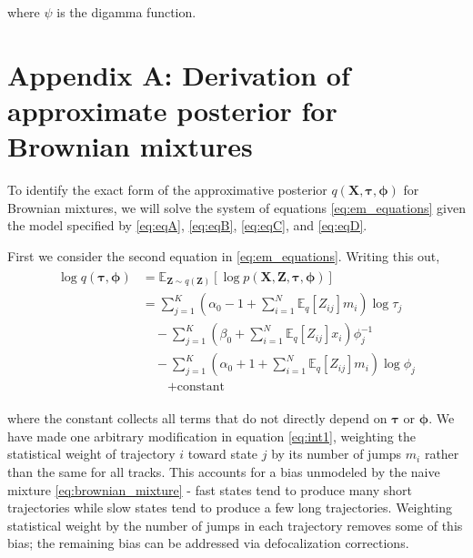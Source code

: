 \documentclass{article}
\let\vec\boldsymbol
\begin{document}
where $\psi$ is the digamma function.

\appendix

\section{Appendix A: Derivation of approximate posterior for Brownian mixtures}\label{appendix:derivation_approx_posterior}

To identify the exact form of the approximative posterior $q(\vec{X}, \boldsymbol{\tau}, \boldsymbol{\phi})$ for Brownian mixtures, we will solve the system of equations \ref{eq:em_equations} given the model specified by \ref{eq:eqA}, \ref{eq:eqB}, \ref{eq:eqC}, and \ref{eq:eqD}. \newline

First we consider the second equation in \ref{eq:em_equations}. Writing this out,
\begin{align}\begin{split}\label{eq:int1}
    \log q \left( \boldsymbol{\tau}, \boldsymbol{\phi} \right) &= \mathbb{E}_{\vec{Z} \sim q(\vec{Z})} \left[ \log p \left( \vec{X}, \vec{Z}, \boldsymbol{\tau}, \boldsymbol{\phi} \right) \right] \\
    &= \sum\limits_{j=1}^{K} \left( \alpha_{0} - 1 + \sum\limits_{i=1}^{N} \mathbb{E}_{q} \left[ Z_{ij} \right] m_{i} \right) \log \tau_{j} \\
    &\quad - \sum\limits_{j=1}^{K} \left( \beta_{0} + \sum\limits_{i=1}^{N} \mathbb{E}_{q} \left[ Z_{ij} \right] x_{i} \right) \phi_{j}^{-1} \\
    &\quad - \sum\limits_{j=1}^{K} \left(
        \alpha_{0} + 1 + \sum\limits_{i=1}^{N} \mathbb{E}_{q} \left[ Z_{ij} \right] m_{i}
    \right) \log \phi_{j} \\
    &\qquad + \text{constant}
\end{split}\end{align}

where the constant collects all terms that do not directly depend
on $\boldsymbol{\tau}$ or $\boldsymbol{\phi}$. We have made one
arbitrary modification in equation \ref{eq:int1}, weighting the statistical
weight of trajectory $i$ toward state $j$ by its number of jumps $m_{i}$
rather than the same for all tracks. This accounts for a bias unmodeled
by the naive mixture \ref{eq:brownian_mixture} - fast states tend to produce
many short trajectories while slow states tend to produce a few long trajectories. Weighting statistical weight by the number of jumps in each trajectory removes some of this bias; the remaining bias can be addressed via defocalization corrections. \newline
\end{document}
